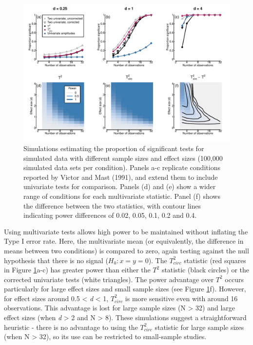 \documentclass[]{article}
\begin{document}
\begin{figure}

{\centering \includegraphics{figures/powerfig} 

}

\caption{Simulations estimating the proportion of significant tests for simulated data with different sample sizes and effect sizes (100,000 simulated data sets per condition). Panels a-c replicate conditions reported by Victor and Mast (1991), and extend them to include univariate tests for comparison. Panels (d) and (e) show a wider range of conditions for each multivariate statistic. Panel (f) shows the difference between the two statistics, with contour lines indicating power differences of 0.02, 0.05, 0.1, 0.2 and 0.4.}\label{fig:powerfig}
\end{figure}

Using multivariate tests allows high power to be maintained without inflating the Type I error rate. Here, the multivariate mean (or equivalently, the difference in means between two conditions) is compared to zero, again testing against the null hypothesis that there is no signal (\(H_0: x = y = 0\)). The \(T^2_{circ}\) statistic (red squares in Figure \ref{fig:powerfig}a-c) has greater power than either the \(T^2\) statistic (black circles) or the corrected univariate tests (white triangles). The power advantage over \(T^2\) occurs particularly for large effect sizes and small sample sizes (see Figure \ref{fig:powerfig}f). However, for effect sizes around 0.5 \textless{} \emph{d} \textless{} 1, \(T^2_{circ}\) is more sensitive even with around 16 observations. This advantage is lost for large sample sizes (N \textgreater{} 32) and large effect sizes (when \emph{d} \textgreater{} 2 and N \textgreater{} 8). These simulations suggest a straightforward heuristic - there is no advantage to using the \(T^2_{circ}\) statistic for large sample sizes (when N \textgreater{} 32), so its use can be restricted to small-sample studies.
\end{document}
